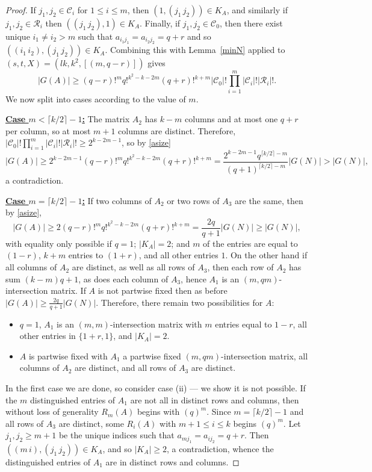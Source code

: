 \documentclass{daj}
\theoremstyle{plain}
\theoremstyle{definition}
\begin{document}
\begin{proof}
If $j_1,j_2\in \mathcal{C}_i$ for $1\leq i\leq m$, then $(1, (j_1\, j_2))\in K_A$, and similarly if $j_1,j_2\in \mathcal{R}_i$ then $((j_1\, j_2),1)\in K_A$. Finally, if $j_1,j_2\in \mathcal{C}_0$, then there exist unique $i_1\ne i_2>m$ such that $a_{i_1j_1}=a_{i_2j_2}=q+r$ and so $((i_1\, i_2), (j_1\, j_2))\in K_A$. Combining this with Lemma~\ref{minN} applied to $(s,t,X)=(lk,k^2,[(m,q-r)])$ gives \begin{equation}\label{asize}|G(A)|\geq (q-r)!^mq!^{k^2-k-2m}(q+r)!^{k+m}|\mathcal{C}_0|!\prod_{i=1}^{m}|\mathcal{C}_i|!|\mathcal{R}_i|!.\end{equation} We now split into cases according to the value of $m$.

\vspace{11pt}\noindent \underline{\textbf{Case $m<\lceil k/2\rceil -1$:}} The matrix $A_2$ has $k-m$ columns and at most one $q+r$ per column, so at most $m+1$ columns are distinct. Therefore, $|\mathcal{C}_0|!\prod_{i=1}^{m}|\mathcal{C}_i|!|\mathcal{R}_i|!\geq 2^{k-2m-1}$, so by \eqref{asize} $$|G(A)|\geq 2^{k-2m-1}(q-r)!^mq!^{k^2-k-2m}(q+r)!^{k+m}=\frac{2^{k-2m-1}q^{\lceil k/2\rceil-m}}{(q+1)^{\lceil k/2\rceil-m}}|G(N)|>|G(N)|,$$ a contradiction.

\vspace{11pt}\noindent \underline{\textbf{Case $m=\lceil k/2\rceil -1$:}} If two columns of $A_2$ or two rows of $A_3$ are the same, then by \eqref{asize}, $$|G(A)|\geq2(q-r)!^mq!^{k^2-k-2m}(q+r)!^{k+m}=\frac{2q}{q+1}|G(N)|\geq |G(N)|,$$ with equality only possible if $q=1$; $|K_A|=2$; and $m$ of the entries are equal to $(1-r)$, $k+m$ entries to $(1+r)$, and all other entries $1$. 
 On the other hand if all columns of $A_2$ are distinct, as well as all rows of $A_3$, then each row of $A_2$ has sum $(k-m)q+1$, as does each column of $A_3$, hence $A_1$ is an $(m,qm)$-intersection matrix. If $A$ is not partwise fixed then as before $|G(A)|\geq\frac{2q}{q+1}|G(N)|.$ Therefore, there remain two possibilities for $A$:
\begin{itemize}
    \item[(i)] $q=1$, $A_1$ is an $(m,m)$-intersection matrix with $m$ entries equal to $1-r$, all other entries in $\{1+r,1\}$,  and $|K_A|=2$.
    \item[(ii)] $A$ is partwise fixed with $A_1$ a partwise fixed $(m,qm)$-intersection matrix, all columns of $A_2$ are distinct, and all rows of $A_3$ are distinct.

\end{itemize}
In the first case we are done, so consider case (ii) --- we show it is not possible. If the $m$ distinguished entries of $A_1$ are not all in distinct rows and columns, then without loss of generality $R_{m}(A)$ begins with $(q)^m$. Since $m=\lceil k/2\rceil-1$ and all rows of $A_3$ are distinct, some $R_i(A)$ with $m+1\leq i\leq k$ begins $(q)^m$. Let $j_1,j_2\geq m+1$ be the unique indices such that $a_{mj_1}=a_{ij_2}=q+r$. Then $((m\, i), (j_1\,j_2))\in K_A$, and so $|K_A|\geq2$, a contradiction, whence the distinguished entries of $A_1$ are in distinct rows and columns.


\end{proof}
\end{document}
